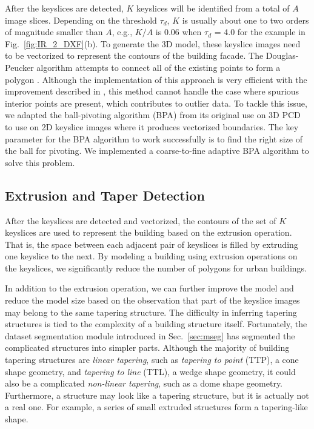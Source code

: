 \documentclass[10pt,twocolumn,letterpaper]{article}
\newcommand{\Sec}[1]{Sec.~\ref{sec:#1}}
\newcommand{\Figb}[1]{Fig.~\ref{fig:#1}(b)}
\begin{document}
After the keyslices are detected, $K$ keyslices will be identified
from a total of $A$ image slices.
Depending on the threshold $\tau_{d}$, $K$ is usually about one to two
orders of magnitude smaller than $A$, e.g., $K/A$ is 0.06 when
$\tau_d$ = 4.0 for the example in \Figb{IR_2_DXF}.
To generate the 3D model, these keyslice images need to be vectorized to
represent the contours of the building facade.
The Douglas-Peucker algorithm attempts to connect all of the existing points
to form a polygon \cite{DP_DP}.
Although the implementation of this approach is very efficient with the
improvement described in \cite{DP_HS}, this method cannot handle the case
where spurious interior points are present, which contributes to outlier data.
To tackle this issue, we adapted the ball-pivoting algorithm (BPA)
\cite{BPA_BMRS} from its original use on 3D PCD to use on
2D keyslice images where it produces vectorized boundaries.
The key parameter for the BPA algorithm to work successfully is to
find the right size of the ball for pivoting.
We implemented a coarse-to-fine adaptive BPA algorithm to solve this problem.

\subsection{Extrusion and Taper Detection}
\label{sec:tsd}

After the keyslices are detected and vectorized, the contours of
the set of $K$ keyslices are used to represent the building based
on the extrusion operation.
That is, the space between each adjacent pair of keyslices
is filled by extruding one keyslice to the next.
By modeling a building using extrusion operations on the keyslices, 
we significantly reduce the number of polygons for urban buildings. 

In addition to the extrusion operation, we can further improve
the model and reduce the model size based on the observation
that part of the keyslice images may belong to the same tapering structure.
The difficulty in inferring tapering structures is tied to 
the complexity of a building structure itself.
Fortunately, the dataset segmentation module introduced in \Sec{mseg} 
has segmented the complicated structures into simpler parts.
Although the majority of building tapering structures are {\it linear tapering},
such as {\it tapering to point} (TTP), a cone shape geometry,
and {\it tapering to line} (TTL), a wedge shape geometry,
it could also be a complicated {\it non-linear tapering},
such as a dome shape geometry.
Furthermore, a structure may look like a tapering structure, 
but it is actually not a real one.
For example, a series of small extruded structures 
form a tapering-like shape.
\end{document}
